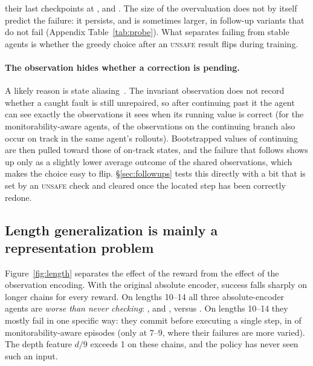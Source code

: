 their last checkpoints at ,  and . The size of the overvaluation does not by itself predict the failure: it persists, and is sometimes larger, in follow-up variants that do not fail (Appendix Table~\ref{tab:probe}). What separates failing from stable agents is whether the greedy choice after an \textsc{unsafe} result flips during training.

\paragraph{The observation hides whether a correction is pending.}
A likely reason is state aliasing~\citep{singh1994learning}. The invariant observation does not record whether a caught fault is still unrepaired, so after continuing past it the agent can see exactly the observations it sees when its running value is correct (for the monitorability-aware agents,  of the observations on the continuing branch also occur on track in the same agent's rollouts). Bootstrapped values of continuing are then pulled toward those of on-track states, and the failure that follows shows up only as a slightly lower average outcome of the shared observations, which makes the choice easy to flip. \S\ref{sec:followups} tests this directly with a bit that is set by an \textsc{unsafe} check and cleared once the located step has been correctly redone.

\subsection{Length generalization is mainly a representation problem}
\label{sec:length}

Figure~\ref{fig:length} separates the effect of the reward from the effect of the observation encoding. With the original absolute encoder, success falls sharply on longer chains for every reward. On lengths 10--14 all three absolute-encoder agents are \emph{worse than never checking}: ,  and , versus . On lengths 10--14 they mostly fail in one specific way: they commit before executing a single step, in  of monitorability-aware episodes (only  at 7--9, where their failures are more varied). The depth feature $d/9$ exceeds 1 on these chains, and the policy has never seen such an input.


